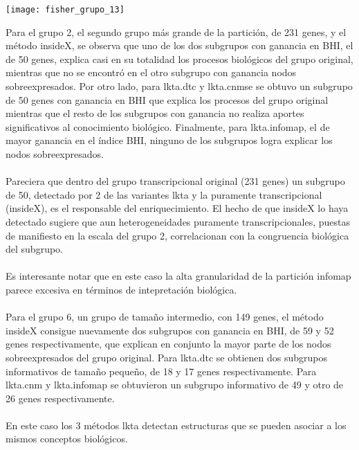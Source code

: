 \begin{sidewaysfigure}[H]
 \centering
\texttt{[image: fisher\_grupo\_13]}
\label{fig:fisher_grupo_13}
\end{sidewaysfigure}

Para el grupo 2, el segundo grupo más grande de la partición, de 231 genes, y el método insideX, se observa que uno de los dos subgrupos con ganancia en BHI, el de 50 genes, explica casi en su totalidad los procesos biológicos del grupo original, mientras que no se encontró en el otro subgrupo con ganancia nodos sobreexpresados. Por otro lado, para lkta.dtc y lkta.cnmse se obtuvo un subgrupo de 50 genes con ganancia en BHI que explica los procesos del grupo original mientras que el resto de los subgrupos con ganancia no realiza aportes significativos al conocimiento biológico. Finalmente, para lkta.infomap, el de mayor ganancia en el índice BHI, ninguno de los subgrupos logra explicar los nodos sobreexpresados.\\\\
Pareciera que dentro del grupo transcripcional original (231 genes) un subgrupo de 50, detectado por 2 de las variantes lkta y la puramente transcripcional (insideX), es el responsable del enriquecimiento. El hecho de que insideX lo haya detectado sugiere que aun heterogeneidades puramente transcripcionales, puestas de manifiesto en la escala del grupo 2, correlacionan con la congruencia biológica del subgrupo.\\\\
Es interesante notar que en este caso la alta granularidad de la partición infomap parece excesiva en términos de intepretación biológica.\\\\
Para el grupo 6, un grupo de tamaño intermedio, con 149 genes, el método insideX consigue nuevamente dos subgrupos con ganancia en BHI, de 59 y 52 genes respectivamente, que explican en conjunto la mayor parte de los nodos sobreexpresados del grupo original. Para lkta.dtc se obtienen dos subgrupos informativos de tamaño pequeño, de 18 y 17 genes respectivamente. Para lkta.cnm y lkta.infomap se obtuvieron un subgrupo informativo de 49 y otro de 26 genes respectivamente.\\\\
En este caso los 3 métodos lkta detectan estructuras que se pueden asociar a los mismos conceptos biológicos.\\\\
